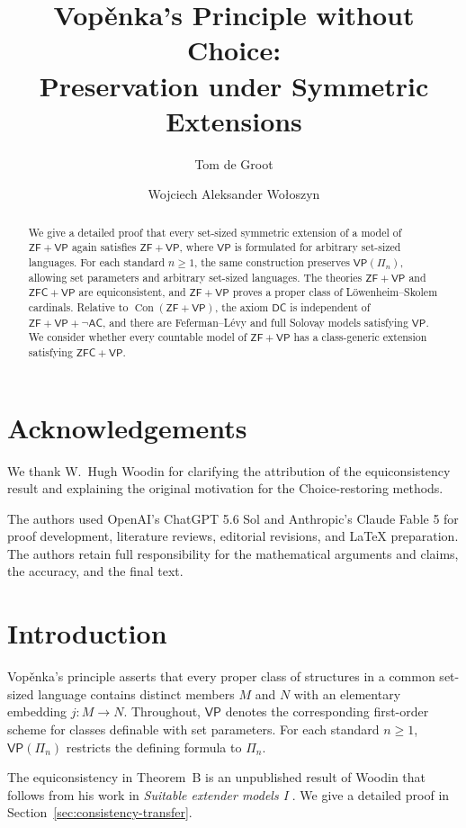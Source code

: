 \documentclass[11pt,a4paper]{amsart}
\title[Vop\v{e}nka's Principle without Choice]{Vop\v{e}nka's Principle without Choice:\\ Preservation under Symmetric Extensions}
\author{Tom de Groot}
\author{Wojciech Aleksander Wo{\l}oszyn}
\date{}
\DeclareRobustCommand{\revision}[1]{#1}
\newcommand{\VP}{\mathsf{VP}}
\newcommand{\AC}{\mathsf{AC}}
\newcommand{\ZF}{\mathsf{ZF}}
\newcommand{\ZFC}{\mathsf{ZFC}}
\newcommand{\Con}{\operatorname{Con}}
\newcommand{\DC}{\mathsf{DC}}
\theoremstyle{plain}
\theoremstyle{definition}
\theoremstyle{remark}
\begin{document}
\begin{abstract}

We \revision{give a detailed proof} that every set-sized symmetric extension of a model of \(\ZF+\VP\) again satisfies \(\ZF+\VP\), where \(\VP\) is formulated for arbitrary set-sized languages.  For each standard \(n\geq1\), the same construction preserves \(\VP(\Pi_n)\), allowing set parameters and arbitrary set-sized languages.  The theories \(\ZF+\VP\) and \(\ZFC+\VP\) are equiconsistent, and \(\ZF+\VP\) proves a proper class of L\"owenheim--Skolem cardinals.  Relative to \(\Con(\ZF+\VP)\), the axiom \(\DC\) is independent of \(\ZF+\VP+\neg\AC\), and there are Feferman--L\'evy and full Solovay models satisfying \(\VP\).  \revision{We consider} whether every countable model of \(\ZF+\VP\) has a class-generic extension satisfying \(\ZFC+\VP\).

\end{abstract}

\maketitle

\section*{Acknowledgements}

\revision{We thank W.~Hugh Woodin for clarifying the attribution
of the equiconsistency result and explaining the original motivation
for the Choice-restoring methods.}

{The authors used OpenAI's ChatGPT 5.6 Sol and Anthropic's Claude Fable 5 for proof development, literature reviews, editorial revisions, and LaTeX preparation.  The authors retain full responsibility for the mathematical arguments and claims, the accuracy, and the final text.}

\section{Introduction}

Vop\v{e}nka's principle asserts that every proper class of structures in a common set-sized language contains distinct members $M$ and $N$ with an elementary embedding $j:M\to N$.  Throughout, $\VP$ denotes the corresponding first-order scheme for classes definable with set parameters.  For each standard $n\geq1$, $\VP(\Pi_n)$ restricts the defining formula to $\Pi_n$.

\revision{The equiconsistency in Theorem~B is an unpublished result
of Woodin that follows from his work in \emph{Suitable extender models I}
\cite{Woodin}. We give a detailed proof in
Section~\ref{sec:consistency-transfer}.}
\end{document}
